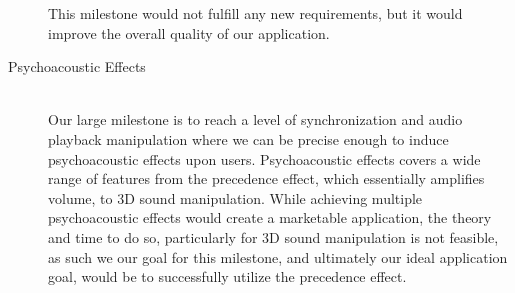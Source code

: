 \begin{description}
        This milestone would not fulfill any new requirements, but it would improve the overall quality of our application.
    \item [Psychoacoustic Effects] \hfill \\
        Our large milestone is to reach a level of synchronization and audio playback manipulation where we can be precise enough to induce psychoacoustic effects upon users.
        Psychoacoustic effects covers a wide range of features from the precedence effect, which essentially amplifies volume, to 3D sound manipulation.
        While achieving multiple psychoacoustic effects would create a marketable application, the theory and time to do so, particularly for 3D sound manipulation is not feasible, as such we our goal for this milestone, and ultimately our ideal application goal, would be to successfully utilize the precedence effect.
\end{description}





